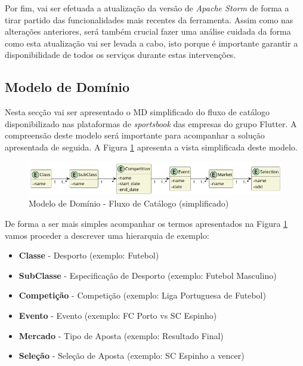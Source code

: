 Por fim, vai ser efetuada a atualização da versão de \textit{Apache Storm} de forma a tirar partido
das funcionalidades mais recentes da ferramenta. Assim como nas alterações anteriores, será também
crucial fazer uma análise cuidada da forma como esta atualização vai ser levada a cabo, isto porque
é importante garantir a disponibilidade de todos os serviços durante estas intervenções. 


\subsection{Modelo de Domínio}

Nesta secção vai ser apresentado o \ac{MD} simplificado do fluxo de catálogo disponibilizado nas 
plataformas de \textit{sportsbook} das empresas do grupo Flutter. A compreensão deste modelo será
importante para acompanhar a solução apresentada de seguida. A Figura \ref{md} apresenta a vista
simplificada deste modelo.

\begin{figure}[H]
  \centerline{\includegraphics[scale=0.4]{media/content/analise/dm.png}}
  \caption{Modelo de Domínio - Fluxo de Catálogo (simplificado)}
  \label{md}
\end{figure}

De forma a ser mais simples acompanhar os termos apresentados na Figura \ref{md} vamos proceder 
a descrever uma hierarquia de exemplo:

\begin{itemize}
  \item \textbf{Classe} - Desporto (exemplo: Futebol)
  \item \textbf{SubClasse} - Especificação de Desporto (exemplo: Futebol Masculino)
  \item \textbf{Competição} - Competição (exemplo: Liga Portuguesa de Futebol)
  \item \textbf{Evento} - Evento (exemplo: FC Porto vs SC Espinho)
  \item \textbf{Mercado} - Tipo de Aposta (exemplo: Resultado Final)
  \item \textbf{Seleção} - Seleção de Aposta (exemplo: SC Espinho a vencer)
\end{itemize}

